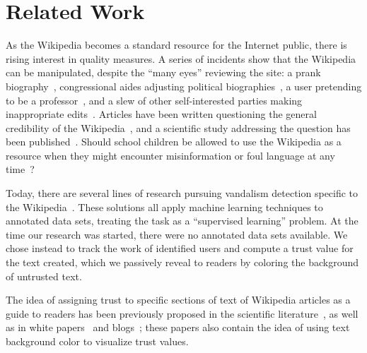 \section{Related Work}

As the Wikipedia becomes a standard resource for the Internet
public, there is rising interest in quality measures.
A series of incidents show that the Wikipedia can be manipulated,
despite the ``many eyes'' reviewing the site:
a prank biography~\cite{Seigenthaler05,NewYorkTimes05a,NewYorkTimes05b},
congressional aides adjusting political
biographies~\cite{TheSun06,NewZelandHerald06,BBC06},
a user pretending to be a professor~\cite{BBC07},
and a slew of other self-interested parties making
inappropriate edits~\cite{Wired07,Wikiscanner07,NPR08}.
Articles have been written questioning the
general credibility of the Wikipedia~\cite{NewYorkTimes06,TheNewYorker06},
and a scientific study addressing the question
has been published~\cite{Giles05}.
Should school children be allowed to use the Wikipedia as
a resource when they might encounter misinformation or foul
language at any time~\cite{Gralla2007,Olanoff2007}?

Today, there are several lines of research pursuing
vandalism detection specific to the Wikipedia~\cite{Potthast2010b}.
These solutions all apply machine learning techniques
to annotated data sets, treating the task as a
``supervised learning'' problem.
At the time our research was started, there were no annotated
data sets available.
We chose instead to track the work of identified users and compute a
trust value for the text created, which we passively reveal to readers
by coloring the background of untrusted text.

The idea of assigning trust to specific sections of text of Wikipedia
articles as a guide to readers has been previously proposed in the scientific
literature~\cite{WikiMTWtrust06,Cr06,McGuinness06}, as well as in white
papers~\cite{King07} and blogs~\cite{PaoloMassa07}; these papers also contain
the idea of using text background color to visualize trust values.


